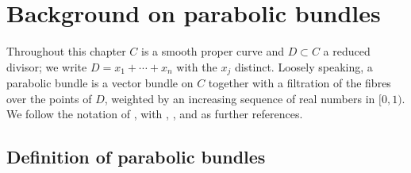 \chapter{Background on parabolic bundles}
\label{chap:parabolic}


\providecommand{\sheafhom}{\mathop{\mathscr{H}\!om}}
\providecommand{\sheafend}{\mathop{\mathscr{E}\!nd}}
\providecommand{\colim}{\operatorname{colim}}

Throughout this chapter $C$ is a smooth proper curve and $D \subset C$ a reduced
divisor; we write $D = x_1 + \cdots + x_n$ with the $x_j$ distinct.
Loosely speaking, a parabolic bundle is a vector bundle on $C$ together with a
filtration of the fibres over the points of $D$, weighted by an increasing
sequence of real numbers in $[0,1)$. We follow the notation of
\cite[\S2.3]{BHH:parabolic}, with
\cite[Part 3, \S1]{seshadri:fibres-vectoriels-sur-les-courbes-algebriques},
\cite{yokogawa:infinitesimal-deformation}, and
\cite{bodenY:moduli-spaces-of-parabolic-higgs-bundles} as further references.

\section{Definition of parabolic bundles}
\label{sec:definition-parabolic}

